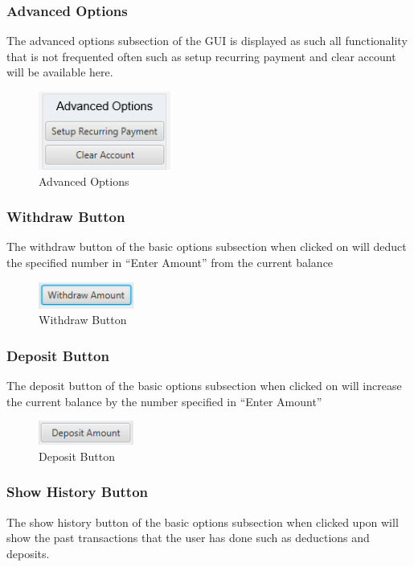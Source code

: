 \documentclass[12pt]{article}
\begin{document}
\subsubsection{Advanced Options}
The advanced options subsection of the GUI is displayed as such all functionality that is not frequented often such as setup recurring payment and clear account will be available here.
\begin{figure}[h!]
  \centering
  \includegraphics[]{advanced_options.png}
  \caption{Advanced Options}
\end{figure}

\subsubsection{Withdraw Button}
The withdraw button of the basic options subsection when clicked on will deduct the specified number in “Enter Amount” from the current balance

\begin{figure}[h!]
  \centering
  \includegraphics[]{withdraw_button.png}
  \caption{Withdraw Button}
\end{figure}

\subsubsection{Deposit Button}

The deposit button of the basic options subsection when clicked on will increase the current balance by the number specified in “Enter Amount”

\begin{figure}[h!]
  \centering
  \includegraphics[]{deposit_button.png}
  \caption{Deposit Button}
\end{figure}

\subsubsection{Show History Button}
The show history button of the basic options subsection when clicked upon will show the past transactions that the user has done such as deductions and deposits.
\end{document}
